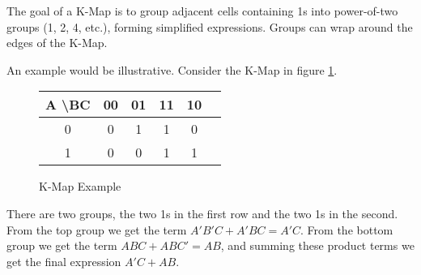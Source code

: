 The goal of a K-Map is to group adjacent cells containing
1s into power-of-two groups (1, 2, 4, etc.), forming simplified expressions.
Groups can wrap around the edges of the K-Map.

An example would be illustrative. Consider the K-Map
in figure \ref{fig:kmapexample}.
\begin{center}
    \begin{figure}
        \begin{center}
            \begin{tabular}{|c|c|c|c|c|c|}
                \hline
                A \textbackslash BC & 00 & 01 & 11 & 10 \\
                \hline
                0                   & 0  & 1  & 1  & 0  \\
                \hline
                1                   & 0  & 0  & 1  & 1  \\
                \hline
            \end{tabular}
        \end{center}
        \caption{K-Map Example}
        \label{fig:kmapexample}
    \end{figure}
\end{center}
There are two groups, the two 1s in the first row
and the two 1s in the second. From the top group
we get the term $A'B'C + A'BC = A'C$. From the bottom group we
get the term $ABC + ABC' = AB$, and summing these product terms
we get the final expression $A'C + AB$.


